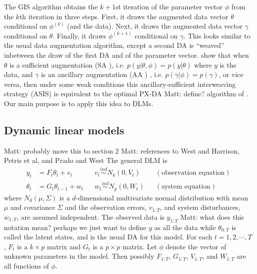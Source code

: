 \documentclass{article}
\newcommand{\matt}[1]{{\color{red} Matt: #1}}
\begin{document}
The GIS algorithm obtains the $k+1$st iteration of the parameter vector $\phi$ from the $k$th iteration in three steps. First, it draws the augmented data vector $\theta$ conditional on $\phi^{(k)}$ (and the data). Next, it draws the augmented data vector $\gamma$ conditional on $\theta$. Finally, it draws $\phi^{(k+1)}$ conditional on $\gamma$. This looks similar to the usual data augmentation algorithm, except a second DA is ``weaved'' inbetween the draw of the first DA and of the parameter vector. \citet{yu2011center} show that when $\theta$ is a sufficient augmentation (SA%
), i.e. $p(y|\theta,\phi)=p(y|\theta)$ where $y$ is the data,  and $\gamma$ is an ancillary augmentation (AA%
) , i.e. $p(\gamma|\phi)=p(\gamma)$, or vice versa, then under some weak conditions this ancillary-sufficient interweaving strategy (ASIS) is equivalent to the optimal PX-DA \matt{define?} algorithm of \citep{meng1999seeking, liu1999parameter, van2001art, hobert2008theoretical}. Our main purpose is to apply this idea to DLMs.

\subsection{Dynamic linear models} \matt{probably move this to section 2} \matt{references to West and Harrison, Petris et al, and Prado and West}
The general DLM is
\begin{align}
y_t &= F_t\theta_t + v_t && v_t \stackrel{ind}{\sim} N_k(0,V_t) && (\mbox{observation equation}) \label{dlmtdobseq}\\
 \theta_t &= G_t\theta_{t-1} + w_t && w_t \stackrel{ind}{\sim} N_p(0,W_t) && (\mbox{system equation}) \label{dlmtdsyseq}
\end{align}
where $N_d(\mu,\Sigma)$ is a $d$-dimensional multivariate normal distribution with mean $\mu$ and covariance $\Sigma$ and the observation errors, $v_{1:T}$, and system disturbances, $w_{1:T}$, are assumed independent. The observed data is $y_{1:T}$ \matt{what does this notation mean? perhaps we just want to define $y$ as all the data} while $\theta_{0:T}$ is called the latent states, and is the usual DA for this model. For each $t=1,2,\cdots,T$, $F_t$ is a $k\times p$ matrix and $G_t$ is a $p\times p$ matrix. Let $\phi$ denote the vector of unknown parameters in the model. Then possibly $F_{1:T}$, $G_{1:T}$, $V_{1:T}$, and $W_{1:T}$ are all functions of $\phi$. 
\end{document}
